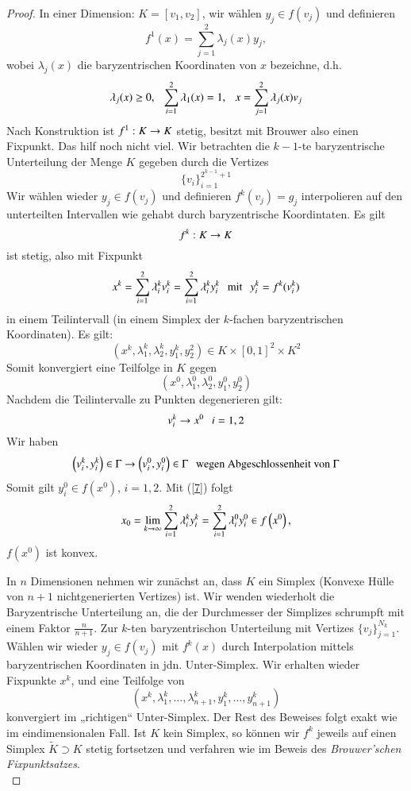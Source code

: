 \begin{proof}
    In einer Dimension: $K=[v_1,v_2]$, wir wählen $y_j\in f(v_j)$ und definieren
    \[
        f^1(x)=\sum_{j=1}^{2} \lambda_j(x)y_j,
    \]
    wobei $\lambda _j(x)$ die baryzentrischen Koordinaten von $x$ bezeichne, d.h.
    \[
        \lambda_j(x)\geq 0, \hspace{.25cm} \sum_{i=1}^2 \lambda_1(x)=1,\hspace{.25cm} x=\sum_{j=1}^2 \lambda_j(x)v_j
    \]
    Nach Konstruktion ist $f^1:K\rightarrow K$ stetig, besitzt mit Brouwer also einen Fixpunkt. Das hilf
    noch nicht viel. Wir betrachten die $k-1$-te baryzentrische Unterteilung der Menge $K$ gegeben
    durch die Vertizes 
    \[
        \{v_i\}_{i=1}^{2^{k-1}+1}
    \]
    Wir wählen wieder $y_j\in f(v_j)$ und definieren $f^k(v_j)=g_j$ interpolieren auf den unterteilten
    Intervallen wie gehabt durch baryzentrische Koordintaten. Es gilt
    \[
        f^k: K\rightarrow K
    \] 
    ist stetig, also mit Fixpunkt
    \begin{align}\label{7}
        x^k=\sum_{i=1}^2 \lambda_i^kv_i^k= \sum_{i=1}^2 \lambda_i^ky_i^k \hspace{.25cm} \text{mit} \hspace{.25cm} 
        y_i^k=f^k(v_i^k)
    \end{align}
    in einem Teilintervall  (in einem Simplex der $k$-fachen baryzentrischen Koordinaten). Es gilt:
    \[
        \left(x^k,\lambda_1^k,\lambda_2^k,y_1^k,y_2^2\right)\in K\times[0,1]^2\times K^2
    \]
    Somit konvergiert eine Teilfolge in $K$ gegen
    \[
        \left(x^0,\lambda_1^0,\lambda_2^0,y_1^0,y_2^0\right)
    \]
    Nachdem die Teilintervalle zu Punkten degenerieren gilt:
    \[
        v_i^k\rightarrow x^0 \hspace{.25cm} i=1,2
    \]
    Wir haben 
    \[
        \left(v_i^k,y_i^k\right)\in\Gamma\rightarrow \left(v_i^0,y_i^0\right)\in \Gamma \hspace{.25cm} 
        \text{wegen Abgeschlossenheit von }\Gamma
    \]
    Somit gilt $y_i^0\in f(x^0)$, $i=1,2$. Mit (\ref{7}) folgt
    \[
        x_0 =\lim_{k\rightarrow\infty} \sum_{i=1}^2\lambda_i^ky_i^k=\sum_{i=1}^2 \lambda^0_iy_i^0 
        \in f\left(x^0\right),
    \]
    $f\left(x^0\right)$ ist konvex. 

    In $n$ Dimensionen nehmen wir zunächst an, dass $K$ ein Simplex (Konvexe Hülle von $n+1$
    nichtgenerierten Vertizes) ist. Wir wenden wiederholt die Baryzentrische Unterteilung an,
    die der Durchmesser der Simplizes schrumpft mit einem Faktor $\frac{n}{n+1}$.
    Zur $k$-ten baryzentrischon Unterteilung mit Vertizes $\{v_j\}_{j=1}^{N_k}$. Wählen wir wieder
    $y_j\in f(v_j)$ mit $f^k(x)$ durch Interpolation mittels baryzentrischen Koordinaten in jdn.
    Unter-Simplex. Wir erhalten wieder Fixpunkte $x^k$, und eine Teilfolge von
    \[
        (x^k,\lambda_1^k,…,\lambda_{n+1}^k,y_1^k,…,y_{n+1}^k)
    \]
    konvergiert im „richtigen“ Unter-Simplex. Der Rest des Beweises folgt exakt wie im eindimensionalen
    Fall. Ist $K$ kein Simplex, so können wir $f^k$ jeweils auf einen Simplex $\tilde K\supset K$ stetig
    fortsetzen und verfahren wie im Beweis des \textit{Brouwer'schen Fixpunktsatzes}.
    \[ \]
\end{proof}

